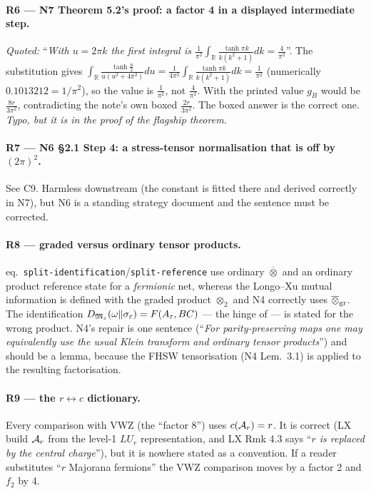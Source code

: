 \documentclass[11pt]{article}
\newcommand{\NIV}{N4}\newcommand{\NV}{N5}\newcommand{\NVI}{N6}\newcommand{\NVII}{N7}
\newcommand{\MI}{F}
\begin{document}
\paragraph{R6 --- \NVII{} Theorem 5.2's proof: a factor 4 in a displayed intermediate step.}
\emph{Quoted:} ``\emph{With $u=2\pi k$ the first integral is $\frac1{\pi^2}\int_{\mathbb R}\frac{\tanh\pi k}{k(k^2+1)}dk=\frac4{\pi^2}$}''.
The substitution gives $\int_{\mathbb R}\frac{\tanh\frac u2}{u(u^2+4\pi^2)}du=\frac1{4\pi^2}\int_{\mathbb R}\frac{\tanh\pi k}{k(k^2+1)}dk=\frac1{\pi^2}$
(numerically $0.1013212=1/\pi^2$), so the value is $\frac1{\pi^2}$, not $\frac4{\pi^2}$.  With the printed value
$g_B$ would be $\frac{8r}{3\pi^2}$, contradicting the note's own boxed $\frac{2r}{3\pi^2}$.  The boxed answer is the
correct one.  \emph{Typo, but it is in the proof of the flagship theorem.}

\paragraph{R7 --- \NVI{} \S2.1 Step 4: a stress-tensor normalisation that is off by $(2\pi)^2$.}
See C9.  Harmless downstream (the constant is fitted there and derived correctly in \NVII), but \NVI{} is a standing
strategy document and the sentence must be corrected.

\paragraph{R8 --- graded versus ordinary tensor products.}
\NII{} eq.~\texttt{split-\allowbreak identification}/\texttt{split-\allowbreak reference} use ordinary $\overline\otimes$ and an ordinary
product reference state for a \emph{fermionic} net, whereas the Longo--Xu mutual information is defined with the graded
product $\otimes_2$ and \NIV{} correctly uses $\overline\otimes_{\rm gr}$.  The identification
$D_{\cM_\eps}(\omega\Vert\sigma_\eps)=\MI(A_\eps,BC)$ --- the hinge of \NII{} --- is stated for the wrong product.
\NIV{}'s repair is one sentence (``\emph{For parity-preserving maps one may equivalently use the usual Klein transform
and ordinary tensor products}'') and should be a lemma, because the FHSW tensorisation (\NIV{} Lem.~3.1) is applied to
the resulting factorisation.

\paragraph{R9 --- the $r\leftrightarrow c$ dictionary.}
Every comparison with VWZ (the ``factor 8'') uses $c(\mathcal A_r)=r$.  It is correct (LX build $\mathcal A_r$ from the level-1
$LU_r$ representation, and LX Rmk 4.3 says ``\emph{$r$ is replaced by the central charge}''), but it is nowhere stated
as a convention.  If a reader substitutes ``$r$ Majorana fermions'' the VWZ comparison moves by a factor 2 and $f_2$ by 4.
\end{document}
